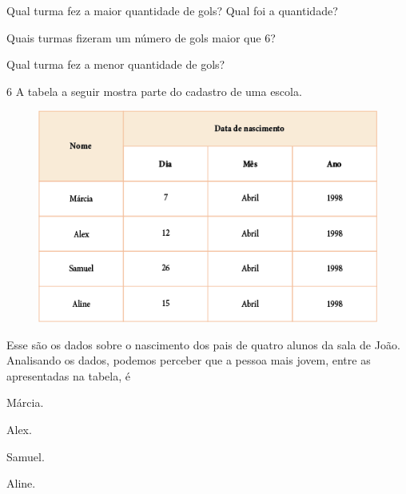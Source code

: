 \begin{escolha}
\item
  Qual turma fez a maior quantidade de gols? Qual foi a quantidade?
\item{}

\item
  Quais turmas fizeram um número de gols maior que 6?
\item{}

\item
  Qual turma fez a menor quantidade de gols?
\item{}
\end{escolha}

\pagebreak
\num{6} A tabela a seguir mostra parte do cadastro de uma escola.

\begin{figure}[htpb!]
\centering
\includegraphics[width=\textwidth]{media/image45.png}
\end{figure}

Esse são os dados sobre o nascimento dos pais de quatro alunos da sala
de João. Analisando os dados, podemos perceber que a pessoa mais jovem,
entre as apresentadas na tabela, é

\begin{escolha}
\item
  Márcia.
\item
  Alex.
\item
  Samuel.
\item
  Aline.
\end{escolha}

